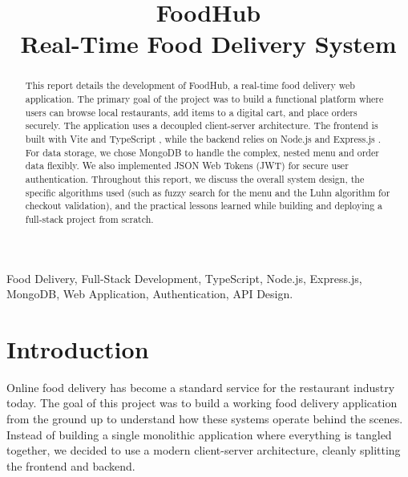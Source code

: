 \documentclass[conference]{IEEEtran}
\begin{document}
\title{\textbf{FoodHub} \\ \small{Real-Time Food Delivery System}}

\author{
\and
{}
}

\maketitle

\begin{abstract}
This report details the development of FoodHub, a real-time food delivery web application. The primary goal of the project was to build a functional platform where users can browse local restaurants, add items to a digital cart, and place orders securely. The application uses a decoupled client-server architecture. The frontend is built with Vite and TypeScript \cite{b2}, while the backend relies on Node.js \cite{b1} and Express.js \cite{b4}. For data storage, we chose MongoDB \cite{b3} to handle the complex, nested menu and order data flexibly. We also implemented JSON Web Tokens (JWT) \cite{b7} for secure user authentication. Throughout this report, we discuss the overall system design, the specific algorithms used (such as fuzzy search for the menu and the Luhn algorithm for checkout validation), and the practical lessons learned while building and deploying a full-stack project from scratch.
\end{abstract}

\begin{IEEEkeywords}
Food Delivery, Full-Stack Development, TypeScript, Node.js, Express.js, MongoDB, Web Application, Authentication, API Design.
\end{IEEEkeywords}

\section{Introduction}
Online food delivery has become a standard service for the restaurant industry today. The goal of this project was to build a working food delivery application from the ground up to understand how these systems operate behind the scenes. Instead of building a single monolithic application where everything is tangled together, we decided to use a modern client-server architecture, cleanly splitting the frontend and backend.
\end{document}
